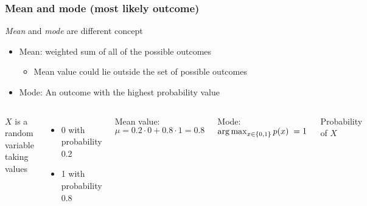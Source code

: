 \begin{frame}
	\frametitle{Mean and mode (most likely outcome)}
	\emph{Mean} and \emph{mode} are different concept\vspace{0.5em}
	\begin{itemize}
		\item Mean: weighted sum of all of the possible outcomes
		\begin{itemize}
			\item Mean value could lie outside the set of possible outcomes
		\end{itemize}
		\item Mode: An outcome with the highest probability value
	\end{itemize}
	\vspace{0.5em}
	\begin{columns}
		$X$ is a random variable taking values
		\begin{itemize}
			\item 0 with probability 0.2 
			\item 1 with probability 0.8
		\end{itemize}
		\vspace*{0.5em}
	
	    Mean value: $\mu=0.2\cdot 0 + 0.8 \cdot 1=0.8$\\\vspace{0.5em}
	    
		Mode: $\operatorname*{arg\,max}_{x\in\{0,1\}} p(x) \;=1$
		
		\begin{block}{Probability of $X$}
			\centering
		\end{block}
	\end{columns}
	
	
	
\end{frame}
